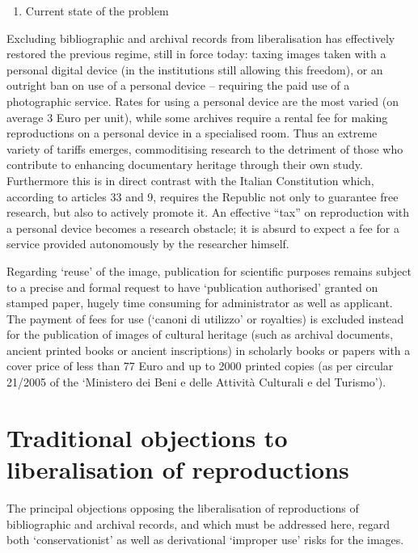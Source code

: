 \documentclass[amsthm,ebook]{saparticle}
\begin{document}
\begin{enumerate}
\item Current state of the problem
\end{enumerate}
Excluding bibliographic and archival records from liberalisation has effectively restored the previous regime, still in
force today: taxing images taken with a personal digital device (in the institutions still allowing this freedom), or
an outright ban on use of a personal device – requiring the paid use of a photographic service. Rates for using a
personal device are the most varied (on average 3 Euro per unit), while some archives require a rental fee for making
reproductions on a personal device in a specialised room. Thus an extreme variety of tariffs emerges, commoditising
research to the detriment of those who contribute to enhancing documentary heritage through their own study.
Furthermore this is in direct contrast with the Italian Constitution which, according to articles 33 and 9, requires
the Republic not only to guarantee free research, but also to actively promote it. An effective ``tax'' on reproduction
with a personal device becomes a research obstacle; it is absurd to expect a fee for a service provided autonomously by
the researcher himself. 

Regarding `reuse' of the image, publication for scientific purposes remains subject to a precise and formal request to
have `publication authorised' granted on stamped paper, hugely time consuming for administrator as well as applicant.
The payment of fees for use (`canoni di utilizzo' or royalties) is excluded instead for the publication of images of
cultural heritage (such as archival documents, ancient printed books or ancient inscriptions) in scholarly books or
papers with a cover price of less than 77 Euro and up to 2000 printed copies (as per circular 21/2005 of the `Ministero
dei Beni e delle Attività Culturali e del Turismo').




\section{Traditional objections to liberalisation of reproductions}



The principal objections opposing the liberalisation of reproductions of bibliographic and archival records, and which
must be addressed here, regard both `conservationist' as well as derivational `improper use' risks for the images.
\end{document}
